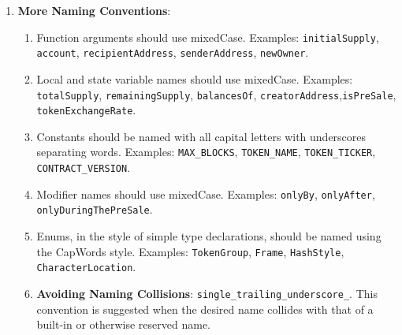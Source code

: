 \begin{enumerate}
\item\textbf{More Naming Conventions}:
    \begin{enumerate}
    \item Function arguments should use mixedCase. Examples: \verb|initialSupply|, \verb|account|, \verb|recipientAddress|, \verb|senderAddress|, \verb|newOwner|.
    \item Local and state variable names should use mixedCase. Examples: \verb|totalSupply|, \verb|remainingSupply|, \verb|balancesOf|, \verb|creatorAddress|,\linebreak\verb|isPreSale|, \verb|tokenExchangeRate|.
    \item Constants should be named with all capital letters with underscores separating words. Examples: \verb|MAX_BLOCKS|, \verb|TOKEN_NAME|, \verb|TOKEN_TICKER|, \verb|CONTRACT_VERSION|.
    \item Modifier names should use mixedCase. Examples: \verb|onlyBy|, \verb|onlyAfter|, \verb|onlyDuringThePreSale|.
    \item Enums, in the style of simple type declarations, should be named using the CapWords style. Examples: \verb|TokenGroup|, \verb|Frame|, \verb|HashStyle|, \verb|CharacterLocation|.
    \item\textbf{Avoiding Naming Collisions}: \verb|single_trailing_underscore_|. This convention is suggested when the desired name collides with that of a built-in or otherwise reserved name.
    \end{enumerate}

\end{enumerate}
